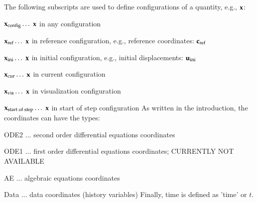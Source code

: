 \documentclass[11pt,a4paper]{book} %
\newcommand{\cIni}{_\mathrm{ini}} %
\newcommand{\cRef}{_\mathrm{ref}} %
\newcommand{\cCur}{_\mathrm{cur}} %
\newcommand{\cVis}{_\mathrm{vis}} %
\newcommand{\cSOS}{_\mathrm{start\;of\;step}}
\newcommand{\cConfig}{_\mathrm{config}} %
\begin{document}
%
The following subscripts are used to define configurations of a quantity, e.g., $\mathbf{x}$:
\bi
  \item $\xv\cConfig \ldots$ $\mathbf{x}$ in any configuration
  \item $\xv\cRef \ldots$ $\mathbf{x}$ in reference configuration, e.g., reference coordinates: $\cv\cRef$
  \item $\xv\cIni \ldots$ $\mathbf{x}$ in initial configuration, e.g., initial displacements: $\uv\cIni$
  \item $\xv\cCur \ldots$ $\mathbf{x}$ in current configuration
  \item $\xv\cVis \ldots$ $\mathbf{x}$ in visualization configuration
  \item $\xv\cSOS \ldots$ $\mathbf{x}$ in start of step configuration
\ei
As written in the introduction, the coordinates can have the types:
\bi
  \item ODE2 $\ldots$ second order differential equations coordinates
  \item ODE1 $\ldots$ first order differential equations coordinates; CURRENTLY NOT AVAILABLE
  \item AE $\ldots$ algebraic equations coordinates
  \item Data $\ldots$ data coordinates (history variables)
\ei
Finally, time is defined as 'time' or $t$.
\end{document}
